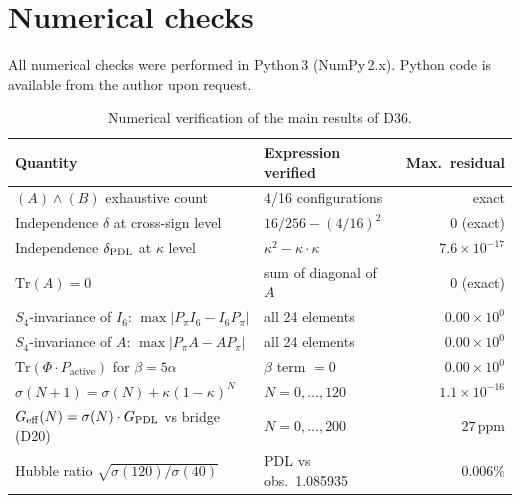 \documentclass[11pt,a4paper]{article}
\theoremstyle{definition}
\newcommand{\PDL}{\textnormal{PDL}}
\newcommand{\GPDL}{G_{\PDL}}
\newcommand{\Geff}{G_{\mathrm{eff}}}
\newcommand{\sig}{\sigma}
\newcommand{\kap}{\kappa}
\begin{document}
\section{Numerical checks}
\label{sec:numerics}

All numerical checks were performed in Python\,3 (NumPy\,2.x). Python code is available from the author upon request.

\begin{table}[ht]
\centering
\caption{Numerical verification of the main results of D36.}
\label{tab:numerics}
\begin{tabular}{llr}
\toprule
Quantity & Expression verified & Max.\ residual \\
\midrule
$(A)\wedge(B)$ exhaustive count & 4/16 configurations & exact \\
Independence $\delta$ at cross-sign level & $16/256 - (4/16)^2$ & $0$ (exact) \\
Independence $\delta_{\PDL}$ at $\kap$ level & $\kap^2 - \kap\cdot\kap$ & $7.6\times10^{-17}$ \\
$\mathrm{Tr}(A) = 0$ & sum of diagonal of $A$ & $0$ (exact) \\
$S_4$-invariance of $I_6$: $\max|P_\pi I_6 - I_6 P_\pi|$ & all 24 elements & $0.00\times10^0$ \\
$S_4$-invariance of $A$: $\max|P_\pi A - AP_\pi|$ & all 24 elements & $0.00\times10^0$ \\
$\mathrm{Tr}(\Phi\cdot P_{\mathrm{active}})$ for $\beta = 5\alpha$ & $\beta$ term $= 0$ & $0.00\times10^0$ \\
$\sig(N+1) = \sig(N) + \kap(1-\kap)^N$ & $N = 0,\ldots,120$ & $1.1\times10^{-16}$ \\
$\Geff(N) = \sig(N)\cdot\GPDL$ vs bridge (D20) & $N = 0,\ldots,200$ & $27\,\mathrm{ppm}$ \\
Hubble ratio $\sqrt{\sig(120)/\sig(40)}$ & PDL vs obs.\ 1.085935 & $0.006\%$ \\
\bottomrule
\end{tabular}
\end{table}
\end{document}
